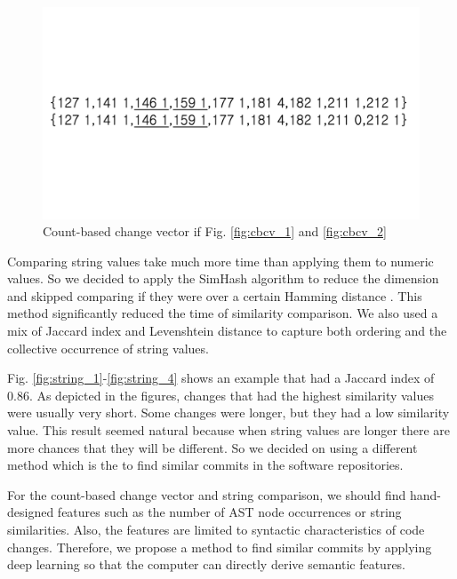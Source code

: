 \begin{figure}[!ht]
    \renewcommand{\arraystretch}{1}
    \centering
    \includegraphics[width=\linewidth]{figures/cbcv-3.pdf}\hfill
    \caption{Count-based change vector if Fig. \ref{fig:cbcv_1} and \ref{fig:cbcv_2}}
    \label{fig:cbcv_3}
\end{figure}


Comparing string values take much more time than applying them to numeric values. 
So we decided to apply the SimHash algorithm to reduce the dimension and skipped comparing if they were over a certain Hamming distance \cite{uddin2011effectiveness}.
This method significantly reduced the time of similarity comparison.
We also used a mix of Jaccard index and Levenshtein distance to capture both ordering and the collective occurrence of string values. 

Fig. \ref{fig:string_1}-\ref{fig:string_4} shows an example that had a Jaccard index of 0.86. 
As depicted in the figures, changes that had the highest similarity values were usually very short. 
Some changes were longer, but they had a low similarity value.
This result seemed natural because when string values are longer there are more chances that they will be different.
So we decided on using a different method which is the {\simfin} to find similar commits in the software repositories.

For the count-based change vector and string comparison, we should find hand-designed features such as the number of AST node occurrences or string similarities.
Also, the features are limited to syntactic characteristics of code changes.
Therefore, we propose a method to find similar commits by applying deep learning so that the computer can directly derive semantic features.

